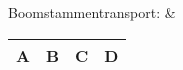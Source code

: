 Boomstammentransport: &
\begin{tabular}{|c|c|c|c|}
	\hline 
	\textbf{A} & \textbf{B} & \textbf{C} & \textbf{D} \\
	\hline 
\end{tabular} \\
